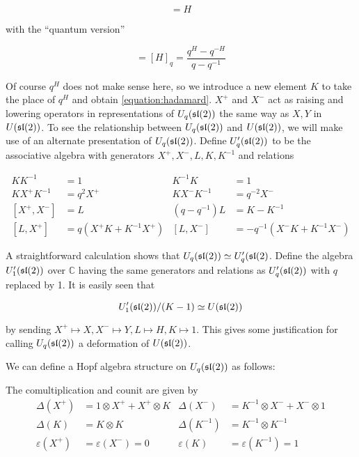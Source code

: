 \begin{equation}
[X,Y] = H
\end{equation}

with the ``quantum version''

\begin{equation}
[X^+,X^-] = [H]_q = \frac{q^H - q^{-H}}{q - q^{-1}}
\end{equation}

Of course $q^H$ does not make sense here, so we introduce a new element $K$ to
take the place of $q^H$ and obtain \ref{equation:hadamard}. $X^+$ and $X^-$ act
as raising and lowering operators in representations of $U_q(\mathfrak{sl}(2))$ the same
way as $X,Y$ in $U(\mathfrak{sl}(2))$. To see the relationship between $U_q(\mathfrak{sl}(2))$
and $U(\mathfrak{sl}(2))$, we will make use of an alternate presentation of
$U_q(\mathfrak{sl}(2))$.  Define $U'_q(\mathfrak{sl}(2))$ to be the associative algebra with
generators $ X^+ ,X^-,L,K,K^{-1}$ and relations

\begin{align}
    KK^{-1} &= 1 &  K^{-1}K  &=1 \\
    KX^+K^{-1} &= q^2 X^+ & KX^-K^{-1} &= q^{-2} X^- \\
    [X^+,X^-] &= L  & (q - q^{-1})L &= K-K^{-1} \\
    [L,X^+] &= q(X^+K + K^{-1}X^+) & [L,X^-] &= -q^{-1}(X^-K + K^{-1}X^-)
\end{align}

A straightforward calculation shows that $U_q(\mathfrak{sl}(2)) \simeq U_q'(\mathfrak{sl}(2)$. 
Define the algebra $U_1'(\mathfrak{sl}(2))$ over $\mathbb{C}$ having the same
generators and relations as $U_q'(\mathfrak{sl}(2))$ with $q$ replaced by 1. It is
easily seen that 

\begin{equation}
U_1'(\mathfrak{sl}(2)) /(K-1) \simeq U(\mathfrak{sl}(2))
\end{equation}

by sending $X^+ \mapsto X, X^- \mapsto Y, L \mapsto H, K \mapsto 1$. This gives
some justification for calling $U_q(\mathfrak{sl}(2))$ a deformation of $U(\mathfrak{sl}(2))$.

We can define a Hopf algebra structure on $U_q(\mathfrak{sl}(2))$ as follows:

The comultiplication and counit are given by
\begin{align}
    \Delta(X^+) &= 1 \otimes  X^+  +  X^+  \otimes K &  \Delta(X^-) &= K^{-1} \otimes X^- + X^- \otimes 1 \\
    \Delta(K) &= K \otimes K &  \Delta(K^{-1}) &= K^{-1} \otimes K^{-1}\\ 
    \varepsilon(X^+) &= \varepsilon(X^-) = 0 &  \varepsilon(K) &= \varepsilon(K^{-1}) = 1
\end{align}

